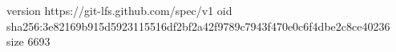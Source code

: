 version https://git-lfs.github.com/spec/v1
oid sha256:3e82169b915d5923115516df2bf2a42f9789c7943f470e0c6f4dbe2c8ce40236
size 6693
